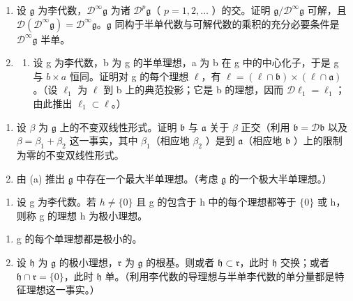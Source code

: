 \begin{enumerate}
\def\labelenumi{\arabic{enumi}.}
\setcounter{enumi}{5}
\item
  设 \(\mathfrak{g}\) 为李代数，\(\mathcal{D}^{\infty}\mathfrak{g}\) 为诸 \(\mathcal{D}^{p}\mathfrak{g}\)（ \(p = 1,2,\ldots\) ）的交。证明 \(\mathfrak{g}/\mathcal{D}^{\infty}\mathfrak{g}\) 可解，且 \(\mathcal{D}(\mathcal{D}^{\infty}\mathfrak{g}) = \mathcal{D}^{\infty}\mathfrak{g}\)。\(\mathfrak{g}\) 同构于半单代数与可解代数的乘积的充分必要条件是 \(\mathcal{D}^{\infty}\mathfrak{g}\) 半单。
\item
  \begin{enumerate}
  \def\labelenumii{(\alph{enumii})}
  \tightlist
  \item
    设 g 为李代数，b 为 g 的半单理想，a 为 b 在 g 中的中心化子，于是 g 与 \(b \times a\) 恒同。证明对 g 的每个理想 \(\ell\)，有 \(\ell = (\ell \cap \mathfrak{b}) \times (\ell \cap \mathfrak{a})\)。（设 \(\ell_{1}\) 为 \(\ell\) 到 b 上的典范投影；它是 b 的理想，因而 \(\mathcal{D}\ell_{1} = \ell_{1}\)；由此推出 \(\ell_{1} \subset \ell\)。）
  \end{enumerate}
\end{enumerate}

\begin{enumerate}
\def\labelenumi{(\alph{enumi})}
\setcounter{enumi}{1}
\item
  设 \(\beta\) 为 \(\mathfrak{g}\) 上的不变双线性形式。证明 \(\mathfrak{b}\) 与 \(\mathfrak{a}\) 关于 \(\beta\) 正交（利用 \(\mathfrak{b} = \mathcal{D}\mathfrak{b}\) 以及 \(\beta = \beta_{1} + \beta_{2}\) 这一事实，其中 \(\beta_{1}\)（相应地 \(\beta_{2}\) ）是到 \(\mathfrak{a}\)（相应地 \(\mathfrak{b}\) ）上的限制为零的不变双线性形式。
\item
  由 (a) 推出 \(\mathfrak{g}\) 中存在一个最大半单理想。（考虑 \(\mathfrak{g}\) 的一个极大半单理想。）
\end{enumerate}

\begin{enumerate}
\def\labelenumi{\arabic{enumi}.}
\setcounter{enumi}{7}
\tightlist
\item
  设 g 为李代数。若 \(h \neq \{0\}\) 且 g 的包含于 h 中的每个理想都等于 \(\{0\}\) 或 h，则称 g 的理想 h 为极小理想。
\end{enumerate}

\begin{enumerate}
\def\labelenumi{(\alph{enumi})}
\item
  g 的每个单理想都是极小的。
\item
  设 \(\mathfrak{h}\) 为 \(\mathfrak{g}\) 的极小理想，\(\mathfrak{r}\) 为 \(\mathfrak{g}\) 的根基。则或者 \(\mathfrak{h} \subset \mathfrak{r}\)，此时 \(\mathfrak{h}\) 交换；或者 \(\mathfrak{h} \cap \mathfrak{r} = \{0\}\)，此时 \(\mathfrak{h}\) 单。（利用李代数的导理想与半单李代数的单分量都是特征理想这一事实。）
\end{enumerate}

